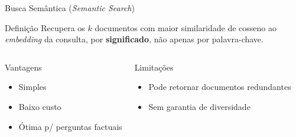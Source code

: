 \documentclass[aspectratio=169]{beamer}
\begin{document}
\begin{frame}{Busca Semântica (\textit{Semantic Search})}
    \begin{block}{Definição}
        \footnotesize Recupera os $k$ documentos com maior similaridade de cosseno ao \textit{embedding} da consulta, por \textbf{significado}, não apenas por palavra-chave.
    \end{block}
    \pause
    \begin{columns}
        \begin{block}{Vantagens}
            \footnotesize\begin{itemize}\item Simples \item Baixo custo \item Ótima p/ perguntas factuais\end{itemize}
        \end{block}
        \begin{alertblock}{Limitações}
            \footnotesize\begin{itemize}\item Pode retornar documentos redundantes \item Sem garantia de diversidade\end{itemize}
        \end{alertblock}
    \end{columns}
\end{frame}
\end{document}
